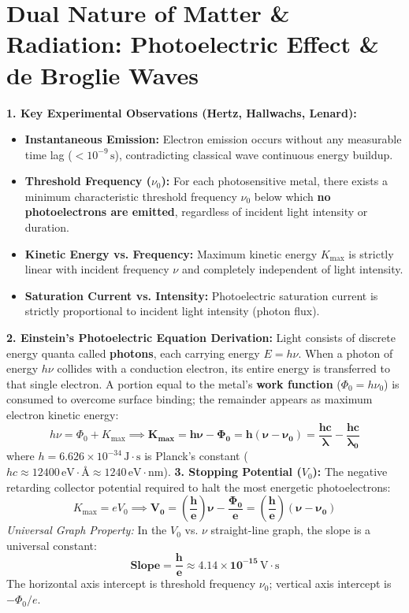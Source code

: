 \documentclass[10pt,twoside,openright]{book}
\begin{document}
\section{Dual Nature of Matter \& Radiation: Photoelectric Effect \& de Broglie Waves}

\begin{conceptbox}
\textbf{1. Key Experimental Observations (Hertz, Hallwachs, Lenard):}
\begin{itemize}
  \item \textbf{Instantaneous Emission:} Electron emission occurs without any measurable time lag ($< 10^{-9}\,\mathrm{s}$), contradicting classical wave continuous energy buildup.
  \item \textbf{Threshold Frequency ($\nu_0$):} For each photosensitive metal, there exists a minimum characteristic threshold frequency $\nu_0$ below which \textbf{no photoelectrons are emitted}, regardless of incident light intensity or duration.
  \item \textbf{Kinetic Energy vs. Frequency:} Maximum kinetic energy $K_{\max}$ is strictly linear with incident frequency $\nu$ and completely independent of light intensity.
  \item \textbf{Saturation Current vs. Intensity:} Photoelectric saturation current is strictly proportional to incident light intensity (photon flux).
\end{itemize}
\textbf{2. Einstein's Photoelectric Equation Derivation:}
Light consists of discrete energy quanta called \textbf{photons}, each carrying energy $E = h\nu$.
When a photon of energy $h\nu$ collides with a conduction electron, its entire energy is transferred to that single electron. A portion equal to the metal's \textbf{work function} ($\Phi_0 = h\nu_0$) is consumed to overcome surface binding; the remainder appears as maximum electron kinetic energy:
\begin{equation}
  h\nu = \Phi_0 + K_{\max} \implies \mathbf{K_{\max} = h\nu - \Phi_0 = h(\nu - \nu_0) = \frac{hc}{\lambda} - \frac{hc}{\lambda_0}}
\end{equation}
where $h = 6.626 \times 10^{-34}\,\mathrm{J}\cdot\mathrm{s}$ is Planck's constant ($hc \approx 12400\,\mathrm{eV}\cdot\text{\AA} \approx 1240\,\mathrm{eV}\cdot\mathrm{nm}$).
\textbf{3. Stopping Potential ($V_0$):}
The negative retarding collector potential required to halt the most energetic photoelectrons:
\begin{equation}
  K_{\max} = e V_0 \implies \mathbf{V_0 = \left(\frac{h}{e}\right)\nu - \frac{\Phi_0}{e} = \left(\frac{h}{e}\right)(\nu - \nu_0)}
\end{equation}
\textit{Universal Graph Property:} In the $V_0$ vs. $\nu$ straight-line graph, the slope is a universal constant:
\begin{equation}
  \mathbf{\text{Slope} = \frac{h}{e} \approx 4.14 \times 10^{-15}\,\mathrm{V}\cdot\mathrm{s}}
\end{equation}
The horizontal axis intercept is threshold frequency $\nu_0$; vertical axis intercept is $-\Phi_0/e$.
\end{conceptbox}
\end{document}
